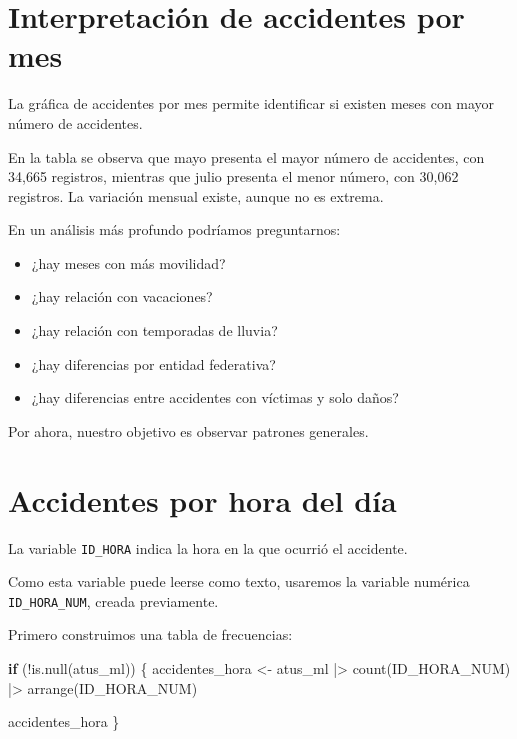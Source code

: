 \documentclass[
  11pt,
  letterpaper,
]{book}
\newenvironment{Shaded}{\begin{snugshade}}{\end{snugshade}}
\newcommand{\ControlFlowTok}[1]{\textcolor[rgb]{0.00,0.23,0.31}{\textbf{#1}}}
\newcommand{\FunctionTok}[1]{\textcolor[rgb]{0.28,0.35,0.67}{#1}}
\newcommand{\NormalTok}[1]{\textcolor[rgb]{0.00,0.23,0.31}{#1}}
\newcommand{\OtherTok}[1]{\textcolor[rgb]{0.00,0.23,0.31}{#1}}
\newcommand{\SpecialCharTok}[1]{\textcolor[rgb]{0.37,0.37,0.37}{#1}}
\providecommand{\tightlist}{%
  \setlength{\itemsep}{0pt}\setlength{\parskip}{0pt}}
\begin{document}
\section{Interpretación de accidentes por
mes}\label{interpretaciuxf3n-de-accidentes-por-mes}

La gráfica de accidentes por mes permite identificar si existen meses
con mayor número de accidentes.

En la tabla se observa que mayo presenta el mayor número de accidentes,
con 34,665 registros, mientras que julio presenta el menor número, con
30,062 registros. La variación mensual existe, aunque no es extrema.

En un análisis más profundo podríamos preguntarnos:

\begin{itemize}
\tightlist
\item
  ¿hay meses con más movilidad?
\item
  ¿hay relación con vacaciones?
\item
  ¿hay relación con temporadas de lluvia?
\item
  ¿hay diferencias por entidad federativa?
\item
  ¿hay diferencias entre accidentes con víctimas y solo daños?
\end{itemize}

Por ahora, nuestro objetivo es observar patrones generales.

\section{Accidentes por hora del
día}\label{accidentes-por-hora-del-duxeda}

La variable \texttt{ID\_HORA} indica la hora en la que ocurrió el
accidente.

Como esta variable puede leerse como texto, usaremos la variable
numérica \texttt{ID\_HORA\_NUM}, creada previamente.

Primero construimos una tabla de frecuencias:

\begin{Shaded}
\begin{Highlighting}[]
\ControlFlowTok{if}\NormalTok{ (}\SpecialCharTok{!}\FunctionTok{is.null}\NormalTok{(atus\_ml)) \{}
\NormalTok{  accidentes\_hora }\OtherTok{\textless{}{-}}\NormalTok{ atus\_ml }\SpecialCharTok{|\textgreater{}}
    \FunctionTok{count}\NormalTok{(ID\_HORA\_NUM) }\SpecialCharTok{|\textgreater{}}
    \FunctionTok{arrange}\NormalTok{(ID\_HORA\_NUM)}

\NormalTok{  accidentes\_hora}
\NormalTok{\}}
\end{Highlighting}
\end{Shaded}
\end{document}
